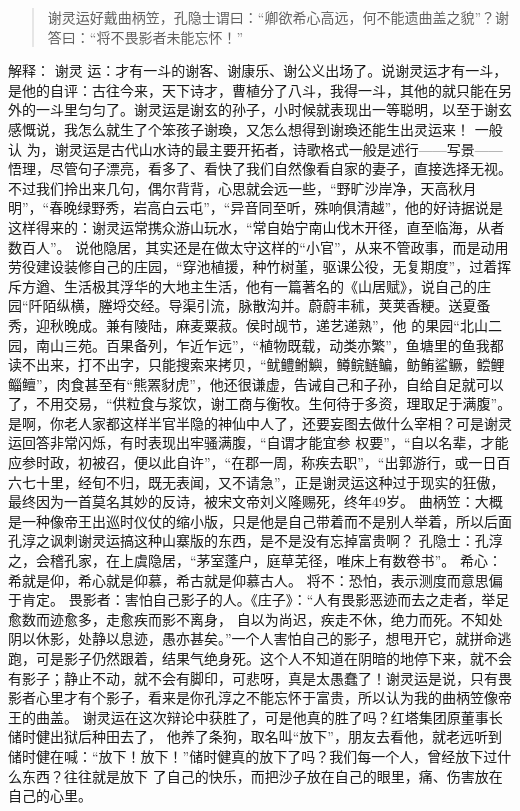 \documentclass[]{book}
\begin{document}
\begin{quote}
谢灵运好戴曲柄笠，孔隐士谓曰：``卿欲希心高远，何不能遗曲盖之貌''？谢答曰：``将不畏影者未能忘怀！''
\end{quote}

解释： 谢灵
运：才有一斗的谢客、谢康乐、谢公义出场了。说谢灵运才有一斗，是他的自评：古往今来，天下诗才，曹植分了八斗，我得一斗，其他的就只能在另外的一斗里匀匀了。谢灵运是谢玄的孙子，小时候就表现出一等聪明，以至于谢玄感慨说，我怎么就生了个笨孩子谢瑍，又怎么想得到谢瑍还能生出灵运来！
一般认
为，谢灵运是古代山水诗的最主要开拓者，诗歌格式一般是述行------写景------悟理，尽管句子漂亮，看多了、看快了我们自然像看自家的妻子，直接选择无视。不过我们拎出来几句，偶尔背背，心思就会远一些，``野旷沙岸净，天高秋月明''，``春晚绿野秀，岩高白云屯''，``异音同至听，殊响俱清越''，他的好诗据说是这样得来的：谢灵运常携众游山玩水，``常自始宁南山伐木开径，直至临海，从者数百人''。
说他隐居，其实还是在做太守这样的``小官''，从来不管政事，而是动用劳役建设装修自己的庄园，``穿池植援，种竹树堇，驱课公役，无复期度''，过着挥斥方遒、生活极其浮华的大地主生活，他有一篇著名的《山居赋》，说自己的庄园``阡陌纵横，塍埒交经。导渠引流，脉散沟并。蔚蔚丰秫，荚荚香粳。送夏蚤秀，迎秋晚成。兼有陵陆，麻麦粟菽。侯时觇节，递艺递熟''，他
的果园``北山二园，南山三苑。百果备列，乍近乍远''，``植物既载，动类亦繁''，鱼塘里的鱼我都读不出来，打不出字，只能搜索来拷贝，``鱿鳢鲋鱮，鳟鲩鲢鳊，鲂鲔鲨鳜，鲿鲤鲻鳣''，肉食甚至有``熊罴豺虎''，他还很谦虚，告诫自己和子孙，自给自足就可以了，不用交易，``供粒食与浆饮，谢工商与衡牧。生何待于多资，理取足于满腹''。是啊，你老人家都这样半官半隐的神仙中人了，还要妄图去做什么宰相？可是谢灵运回答非常闪烁，有时表现出牢骚满腹，``自谓才能宜参
权要''，``自以名辈，才能应参时政，初被召，便以此自许''，``在郡一周，称疾去职''，``出郭游行，或一日百六七十里，经旬不归，既无表闻，又不请急''，正是谢灵运这种过于现实的狂傲，最终因为一首莫名其妙的反诗，被宋文帝刘义隆赐死，终年49岁。
曲柄笠：大概是一种像帝王出巡时仪仗的缩小版，只是他是自己带着而不是别人举着，所以后面孔淳之讽刺谢灵运搞这种山寨版的东西，是不是没有忘掉富贵啊？
孔隐士：孔淳之，会稽孔家，在上虞隐居，``茅室蓬户，庭草芜径，唯床上有数卷书''。
希心：希就是仰，希心就是仰慕，希古就是仰慕古人。
将不：恐怕，表示测度而意思偏于肯定。
畏影者：害怕自己影子的人。《庄子》：``人有畏影恶迹而去之走者，举足愈数而迹愈多，走愈疾而影不离身，
自以为尚迟，疾走不休，绝力而死。不知处阴以休影，处静以息迹，愚亦甚矣。''一个人害怕自己的影子，想甩开它，就拼命逃跑，可是影子仍然跟着，结果气绝身死。这个人不知道在阴暗的地停下来，就不会有影子；静止不动，就不会有脚印，可悲呀，真是太愚蠢了！谢灵运是说，只有畏影者心里才有个影子，看来是你孔淳之不能忘怀于富贵，所以认为我的曲柄笠像帝王的曲盖。
谢灵运在这次辩论中获胜了，可是他真的胜了吗？红塔集团原董事长储时健出狱后种田去了，
他养了条狗，取名叫``放下''，朋友去看他，就老远听到储时健在喊：``放下！放下！''储时健真的放下了吗？我们每一个人，曾经放下过什么东西？往往就是放下
了自己的快乐，而把沙子放在自己的眼里，痛、伤害放在自己的心里。
\end{document}
